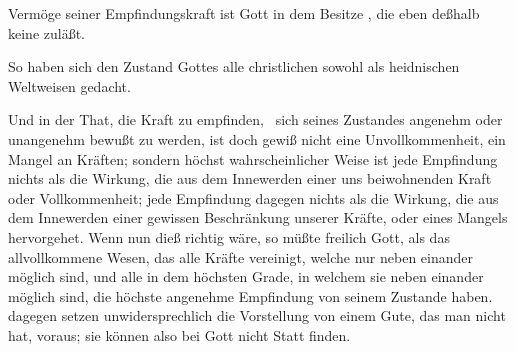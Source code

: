 \begin{aufza}
\item Vermöge seiner Empfindungskraft ist Gott in dem Besitze , die eben deßhalb keine  zuläßt.
\item So haben sich den Zustand Gottes alle christlichen sowohl als heidnischen Weltweisen gedacht.
\item Und in der That, die Kraft zu empfinden, \dh\ sich seines Zustandes angenehm oder unangenehm bewußt zu werden, ist doch gewiß nicht eine Unvollkommenheit, ein Mangel an Kräften; sondern höchst wahrscheinlicher Weise ist jede  Empfindung nichts als die Wirkung, die aus dem Innewerden einer uns beiwohnenden Kraft oder Vollkommenheit; jede  Empfindung dagegen nichts als die Wirkung, die aus dem Innewerden einer gewissen Beschränkung unserer Kräfte, oder eines Mangels hervorgehet. Wenn nun dieß richtig wäre, so müßte freilich Gott, als das allvollkommene Wesen, das alle Kräfte vereinigt, welche nur neben einander möglich sind, und alle in dem höchsten Grade, in welchem sie neben einander möglich sind, die höchste angenehme Empfindung von seinem Zustande haben.  dagegen setzen unwidersprechlich die Vorstellung von einem Gute, das man nicht hat, voraus; sie können also bei Gott nicht Statt finden.~
\end{aufza}

